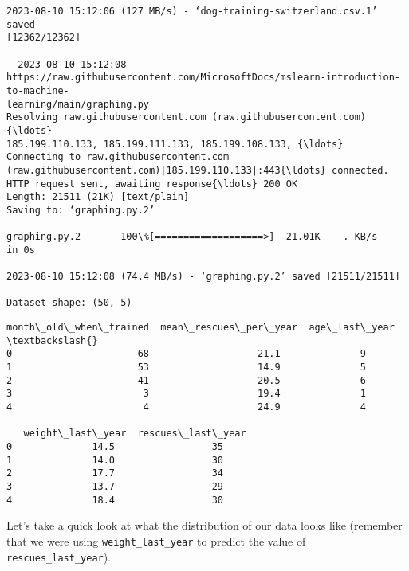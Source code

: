 \documentclass[11pt]{article}
\makeatletter
\newcommand{\boxspacing}{\kern\kvtcb@left@rule\kern\kvtcb@boxsep}
\newcommand{\prompt}[4]{
        {\ttfamily\llap{{\color{#2}[#3]:\hspace{3pt}#4}}\vspace{-\baselineskip}}
    }
\makeatother
\begin{document}
\begin{Verbatim}[commandchars=\\\{\}]
2023-08-10 15:12:06 (127 MB/s) - ‘dog-training-switzerland.csv.1’ saved
[12362/12362]

--2023-08-10 15:12:08--
https://raw.githubusercontent.com/MicrosoftDocs/mslearn-introduction-to-machine-
learning/main/graphing.py
Resolving raw.githubusercontent.com (raw.githubusercontent.com){\ldots}
185.199.110.133, 185.199.111.133, 185.199.108.133, {\ldots}
Connecting to raw.githubusercontent.com
(raw.githubusercontent.com)|185.199.110.133|:443{\ldots} connected.
HTTP request sent, awaiting response{\ldots} 200 OK
Length: 21511 (21K) [text/plain]
Saving to: ‘graphing.py.2’

graphing.py.2       100\%[===================>]  21.01K  --.-KB/s    in 0s

2023-08-10 15:12:08 (74.4 MB/s) - ‘graphing.py.2’ saved [21511/21511]

Dataset shape: (50, 5)
    \end{Verbatim}

            \begin{tcolorbox}[breakable, size=fbox, boxrule=.5pt, pad at break*=1mm, opacityfill=0]
\prompt{Out}{outcolor}{1}{\boxspacing}
\begin{Verbatim}[commandchars=\\\{\}]
   month\_old\_when\_trained  mean\_rescues\_per\_year  age\_last\_year  \textbackslash{}
0                      68                   21.1              9
1                      53                   14.9              5
2                      41                   20.5              6
3                       3                   19.4              1
4                       4                   24.9              4

   weight\_last\_year  rescues\_last\_year
0              14.5                 35
1              14.0                 30
2              17.7                 34
3              13.7                 29
4              18.4                 30
\end{Verbatim}
\end{tcolorbox}
        
    Let's take a quick look at what the distribution of our data looks like
(remember that we were using \texttt{weight\_last\_year} to predict the
value of \texttt{rescues\_last\_year}).
\end{document}
